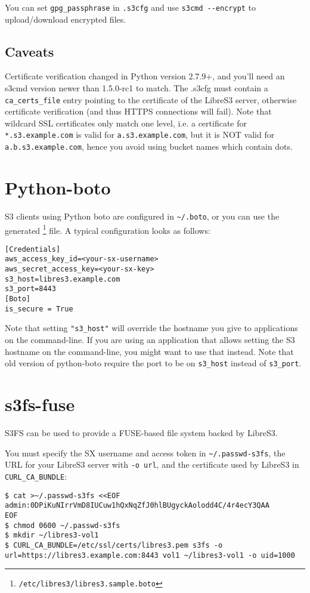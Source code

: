 You can set \verb|gpg_passphrase| in \verb|.s3cfg| and use
\verb|s3cmd --encrypt| to upload/download encrypted files.

\subsection{Caveats}

Certificate verification changed in Python version 2.7.9+, and you'll need
an s3cmd version newer than 1.5.0-rc1 to match.
The .s3cfg must contain a \verb|ca_certs_file| entry pointing to the certificate
of the LibreS3 server, otherwise certificate verification (and thus HTTPS
connections will fail).
Note that wildcard SSL certificates only match one level, i.e.
a certificate for \verb|*.s3.example.com| is valid for \verb|a.s3.example.com|,
but it is NOT valid for \verb|a.b.s3.example.com|, hence you avoid using
bucket names which contain dots.

\section{Python-boto}

S3 clients using Python boto are configured in \verb|~/.boto|,
or you can use the generated \footnote{\verb|/etc/libres3/libres3.sample.boto|} file.
A typical configuration looks as follows:

\begin{lstlisting}
[Credentials]
aws_access_key_id=<your-sx-username>
aws_secret_access_key=<your-sx-key>
s3_host=libres3.example.com
s3_port=8443
[Boto]
is_secure = True
\end{lstlisting}


Note that setting \verb|"s3_host"| will override the hostname you give to
applications on the command-line. If you are using an application that allows
setting the S3 hostname on the command-line, you might want to use that instead.
Note that old version of python-boto require the port to be on \verb|s3_host|
instead of \verb|s3_port|.

\section{s3fs-fuse}

S3FS can be used to provide a FUSE-based file system backed by LibreS3.

You must specify the SX username and access token in \verb|~/.passwd-s3fs|,
the URL for your LibreS3 server with \verb|-o url|, and the certificate
used by LibreS3 in \verb|CURL_CA_BUNDLE|:
\begin{lstlisting}
$ cat >~/.passwd-s3fs <<EOF
admin:0DPiKuNIrrVmD8IUCuw1hQxNqZfJ0hlBUgyckAolodd4C/4r4ecY3QAA
EOF
$ chmod 0600 ~/.passwd-s3fs
$ mkdir ~/libres3-vol1
$ CURL_CA_BUNDLE=/etc/ssl/certs/libres3.pem s3fs -o url=https://libres3.example.com:8443 vol1 ~/libres3-vol1 -o uid=1000
\end{lstlisting}

